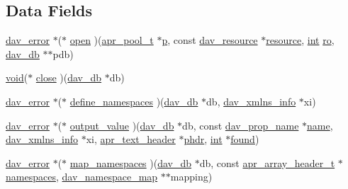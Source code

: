 \subsection*{Data Fields}
\begin{DoxyCompactItemize}
\item 
\hyperlink{structdav__error}{dav\+\_\+error} $\ast$($\ast$ \hyperlink{structdav__hooks__propdb_ae447136ce49c986fb7c3c84a331e066e}{open} )(\hyperlink{structapr__pool__t}{apr\+\_\+pool\+\_\+t} $\ast$\hyperlink{group__APACHE__CORE__MPM_ga5cd91701e5c167f2b1a38e70ab57817e}{p}, const \hyperlink{structdav__resource}{dav\+\_\+resource} $\ast$\hyperlink{group__APR__Util__RL_gaa6244aacafcc4ec1d0727bdb32614b11}{resource}, \hyperlink{pcre_8txt_a42dfa4ff673c82d8efe7144098fbc198}{int} \hyperlink{group__MOD__DAV_ga82a842d0e207f481db3ebda5e61c7135}{ro}, \hyperlink{structdav__db}{dav\+\_\+db} $\ast$$\ast$pdb)
\item 
\hyperlink{group__MOD__ISAPI_gacd6cdbf73df3d9eed42fa493d9b621a6}{void}($\ast$ \hyperlink{structdav__hooks__propdb_a5bb9430a24c7237b21250717440abf91}{close} )(\hyperlink{structdav__db}{dav\+\_\+db} $\ast$db)
\item 
\hyperlink{structdav__error}{dav\+\_\+error} $\ast$($\ast$ \hyperlink{structdav__hooks__propdb_ab54e309d9a5269e3bb3bd42a2198d42c}{define\+\_\+namespaces} )(\hyperlink{structdav__db}{dav\+\_\+db} $\ast$db, \hyperlink{structdav__xmlns__info}{dav\+\_\+xmlns\+\_\+info} $\ast$xi)
\item 
\hyperlink{structdav__error}{dav\+\_\+error} $\ast$($\ast$ \hyperlink{structdav__hooks__propdb_a203b6da3e9f82c0e3158461bf1a50b8d}{output\+\_\+value} )(\hyperlink{structdav__db}{dav\+\_\+db} $\ast$db, const \hyperlink{structdav__prop__name}{dav\+\_\+prop\+\_\+name} $\ast$\hyperlink{pcre_8txt_a5a15d68aadb41c771fe50a27c400d49b}{name}, \hyperlink{structdav__xmlns__info}{dav\+\_\+xmlns\+\_\+info} $\ast$xi, \hyperlink{structapr__text__header}{apr\+\_\+text\+\_\+header} $\ast$\hyperlink{group__MOD__DAV_ga08f35dafe4ef680fc79b6e69d71c8f90}{phdr}, \hyperlink{pcre_8txt_a42dfa4ff673c82d8efe7144098fbc198}{int} $\ast$\hyperlink{pcregrep_8txt_a1fdac88190c7a3aca2735f0bf49094dd}{found})
\item 
\hyperlink{structdav__error}{dav\+\_\+error} $\ast$($\ast$ \hyperlink{structdav__hooks__propdb_a3501ba9aa616ed5883eb0e7689b50af3}{map\+\_\+namespaces} )(\hyperlink{structdav__db}{dav\+\_\+db} $\ast$db, const \hyperlink{structapr__array__header__t}{apr\+\_\+array\+\_\+header\+\_\+t} $\ast$\hyperlink{group__APR__Util__XML_gafc0bf98d924fee6000a1e0eb9703d338}{namespaces}, \hyperlink{structdav__namespace__map}{dav\+\_\+namespace\+\_\+map} $\ast$$\ast$mapping)

\end{DoxyCompactItemize}
